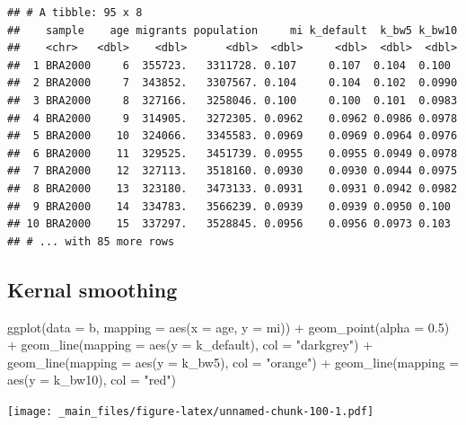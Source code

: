 \documentclass[
]{book}
\newenvironment{Shaded}{\begin{snugshade}}{\end{snugshade}}
\newcommand{\AttributeTok}[1]{\textcolor[rgb]{0.77,0.63,0.00}{#1}}
\newcommand{\FloatTok}[1]{\textcolor[rgb]{0.00,0.00,0.81}{#1}}
\newcommand{\FunctionTok}[1]{\textcolor[rgb]{0.00,0.00,0.00}{#1}}
\newcommand{\NormalTok}[1]{#1}
\newcommand{\SpecialCharTok}[1]{\textcolor[rgb]{0.00,0.00,0.00}{#1}}
\newcommand{\StringTok}[1]{\textcolor[rgb]{0.31,0.60,0.02}{#1}}
\begin{document}
\begin{verbatim}
## # A tibble: 95 x 8
##    sample    age migrants population     mi k_default  k_bw5 k_bw10
##    <chr>   <dbl>    <dbl>      <dbl>  <dbl>     <dbl>  <dbl>  <dbl>
##  1 BRA2000     6  355723.   3311728. 0.107     0.107  0.104  0.100 
##  2 BRA2000     7  343852.   3307567. 0.104     0.104  0.102  0.0990
##  3 BRA2000     8  327166.   3258046. 0.100     0.100  0.101  0.0983
##  4 BRA2000     9  314905.   3272305. 0.0962    0.0962 0.0986 0.0978
##  5 BRA2000    10  324066.   3345583. 0.0969    0.0969 0.0964 0.0976
##  6 BRA2000    11  329525.   3451739. 0.0955    0.0955 0.0949 0.0978
##  7 BRA2000    12  327113.   3518160. 0.0930    0.0930 0.0944 0.0975
##  8 BRA2000    13  323180.   3473133. 0.0931    0.0931 0.0942 0.0982
##  9 BRA2000    14  334783.   3566239. 0.0939    0.0939 0.0950 0.100 
## 10 BRA2000    15  337297.   3528845. 0.0956    0.0956 0.0973 0.103 
## # ... with 85 more rows
\end{verbatim}

\hypertarget{kernal-smoothing-1}{%
\subsection{Kernal smoothing}\label{kernal-smoothing-1}}

\begin{Shaded}
\begin{Highlighting}[]
\FunctionTok{ggplot}\NormalTok{(}\AttributeTok{data =}\NormalTok{ b, }\AttributeTok{mapping =} \FunctionTok{aes}\NormalTok{(}\AttributeTok{x =}\NormalTok{ age, }\AttributeTok{y =}\NormalTok{ mi)) }\SpecialCharTok{+}
  \FunctionTok{geom\_point}\NormalTok{(}\AttributeTok{alpha =} \FloatTok{0.5}\NormalTok{) }\SpecialCharTok{+} 
  \FunctionTok{geom\_line}\NormalTok{(}\AttributeTok{mapping =} \FunctionTok{aes}\NormalTok{(}\AttributeTok{y =}\NormalTok{ k\_default), }\AttributeTok{col =} \StringTok{"darkgrey"}\NormalTok{) }\SpecialCharTok{+}
  \FunctionTok{geom\_line}\NormalTok{(}\AttributeTok{mapping =} \FunctionTok{aes}\NormalTok{(}\AttributeTok{y =}\NormalTok{ k\_bw5), }\AttributeTok{col =} \StringTok{"orange"}\NormalTok{) }\SpecialCharTok{+}
  \FunctionTok{geom\_line}\NormalTok{(}\AttributeTok{mapping =} \FunctionTok{aes}\NormalTok{(}\AttributeTok{y =}\NormalTok{ k\_bw10), }\AttributeTok{col =} \StringTok{"red"}\NormalTok{)}
\end{Highlighting}
\end{Shaded}

\texttt{[image: \_main\_files/figure-latex/unnamed-chunk-100-1.pdf]}
\end{document}
